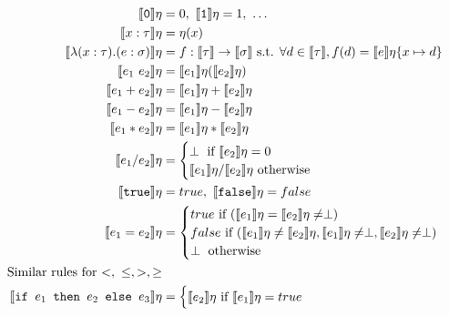  \begin{figure}
 \begin{align*}
 \llbracket \texttt{0} \rrbracket\eta &= 0, \  \llbracket \texttt{1} \rrbracket\eta = 1, \ \ldots \\
  \llbracket x : \tau \rrbracket\eta &= \eta(x) \\
  \llbracket \lambda (x : \tau) . (e : \sigma) \rrbracket\eta &= f : \llbracket \tau \rrbracket \rightarrow \llbracket \sigma \rrbracket
\text{ s.t. } \forall d \in \llbracket \tau \rrbracket, f(d) = \llbracket e \rrbracket\eta\{ x \mapsto d \} \\
 \llbracket e_1 \ e_2 \rrbracket \eta &= \llbracket e_1 \rrbracket\eta ( \llbracket e_2 \rrbracket\eta ) \\
 \llbracket e_1 + e_2 \rrbracket\eta &= \llbracket e_1 \rrbracket\eta + \llbracket e_2 \rrbracket\eta \\
 \llbracket e_1 - e_2 \rrbracket\eta &= \llbracket e_1 \rrbracket\eta - \llbracket e_2 \rrbracket\eta \\
 \llbracket e_1 * e_2 \rrbracket\eta &= \llbracket e_1 \rrbracket\eta * \llbracket e_2 \rrbracket\eta \\
  \llbracket e_1 / e_2 \rrbracket\eta &=
  \begin{cases}
  \perp \text{ if }  \llbracket e_2 \rrbracket\eta = 0 \\
   \llbracket e_1 \rrbracket\eta / \llbracket e_2 \rrbracket\eta \text{ otherwise}
   \end{cases} \\
  \llbracket \texttt{true} \rrbracket\eta &= true, \ \llbracket \texttt{false} \rrbracket\eta = false \\
 \llbracket e_1 = e_2 \rrbracket\eta &= 
 \begin{cases} 
      true \text{ if } (\llbracket e_1 \rrbracket\eta = \llbracket e_2 \rrbracket\eta \neq \perp) \\
      false \text{  if } (\llbracket e_1 \rrbracket\eta \neq \llbracket e_2\rrbracket\eta, \llbracket e_1 \rrbracket\eta \neq \perp, \llbracket e_2 \rrbracket\eta \neq \perp)\\
      \perp \text{ otherwise}
   \end{cases} \\
\text{Similar rules for $<, \ \leq, >, \geq$} \\
  \llbracket \texttt{if } e_1 \texttt{ then } e_2 \texttt{ else } e_3 \rrbracket \eta &= 
 \begin{cases} 
      \llbracket e_2 \rrbracket\eta \text{ if } \llbracket e_1 \rrbracket\eta = true \\

\end{cases}
\end{align*}
\end{figure}

